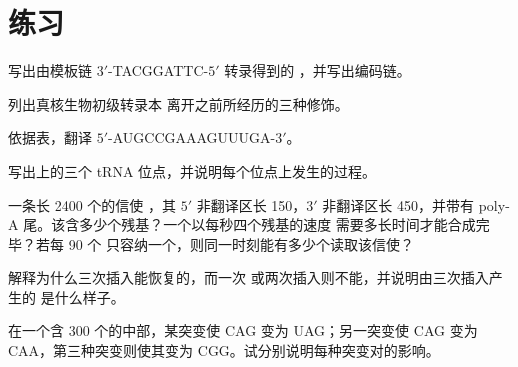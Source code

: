 \section{练习}

\begin{exercise}[$\star$]\label{exo:b1:gene-expression:1}
写出由模板链
$3'$-TACGGATTC-$5'$ 转录得到的 ，并写出编码链。
\end{exercise}

\begin{exercise}[$\star$]\label{exo:b1:gene-expression:2}
列出真核生物初级转录本
离开之前所经历的三种修饰。
\end{exercise}

\begin{exercise}[$\star$]\label{exo:b1:gene-expression:3}
依据表，翻译 $5'$-AUGCCGAAAGUUUGA-$3'$。
\end{exercise}

\begin{exercise}[$\star$]\label{exo:b1:gene-expression:4}
写出上的三个 tRNA 位点，并说明每个位点上发生的过程。
\end{exercise}

\begin{exercise}[$\star\star$]\label{exo:b1:gene-expression:5}
一条长 \qty{2400}{} 个的信使 ，其 $5'$
非翻译区长 \qty{150}{}，$3'$ 非翻译区长 \qty{450}{}，并带有
poly-A 尾。该含多少个残基？一个以每秒四个残基的速度
需要多长时间才能合成完毕？若每 \qty{90}{} 个
只容纳一个，则同一时刻能有多少个读取该信使？
\end{exercise}

\begin{exercise}[$\star\star$]\label{exo:b1:gene-expression:6}
解释为什么三次插入能恢复的，而一次
或两次插入则不能，并说明由三次插入产生的
是什么样子。
\end{exercise}

\begin{exercise}[$\star\star$]\label{exo:b1:gene-expression:7}
在一个含 \qty{300}{} 个的中部，某突变使 CAG
变为 UAG；另一突变使 CAG 变为 CAA，第三种突变则使其变为
CGG。试分别说明每种突变对的影响。
\end{exercise}

